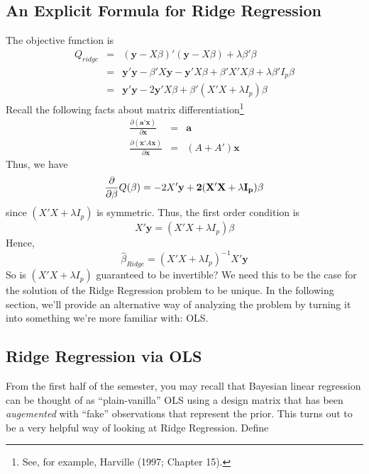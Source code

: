 \documentclass[12pt]{article}
\theoremstyle{definition}
\begin{document}
\subsection{An Explicit Formula for Ridge Regression}
The objective function is
\begin{eqnarray*}
	Q_{ridge}&=& (\mathbf{y} - X\beta)' (\mathbf{y} - X\beta) + \lambda \beta'\beta\\
	&=&\mathbf{y}'\mathbf{y} - \beta'X \mathbf{y} - \mathbf{y}'X\beta + \beta'X'X \beta + \lambda \beta' I_p \beta\\
	&=& \mathbf{y}'\mathbf{y} - 2 \mathbf{y}'X\beta + \beta'(X'X + \lambda I_p)\beta
\end{eqnarray*}
Recall the following facts about matrix differentiation\footnote{See, for example, Harville (1997; Chapter 15).}
	\begin{eqnarray*}
		\frac{\partial (\mathbf{a}' \mathbf{x})}{\partial \mathbf{x}}  &=& \mathbf{a}\\
		\frac{\partial( \mathbf{x}'A \mathbf{x})}{\partial \mathbf{x}} &=& (A + A')\mathbf{x}
	\end{eqnarray*}
Thus, we have 
$$\frac{\partial}{\partial \beta} Q(\beta) = -2X'\bf{y} + 2(X'X + \lambda I_p)\beta$$
since $(X'X + \lambda I_p)$ is symmetric. Thus, the first order condition is 
	$$X'\textbf{y} = (X'X + \lambda I_p)\beta$$
Hence,
	$$\widehat{\beta}_{Ridge} = (X'X + \lambda I_p)^{-1} X'\textbf{y}$$
So is $(X'X + \lambda I_p)$ guaranteed to be invertible? We need this to be the case for the solution of the Ridge Regression problem to be unique. In the following section, we'll provide an alternative way of analyzing the problem by turning it into something we're more familiar with: OLS.

\subsection{Ridge Regression via OLS}
From the first half of the semester, you may recall that Bayesian linear regression can be thought of as ``plain-vanilla'' OLS using a design matrix that has been \emph{augemented} with ``fake'' observations that represent the prior. This turns out to be a very helpful way of looking at Ridge Regression. Define
\end{document}
